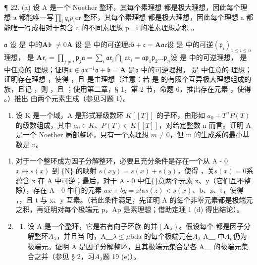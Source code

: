 ¶ 22. (a) 设 A 是一个 Noether 整环，其每个素理想  都是极大理想，因此每个理想 a  都能唯一写\(\prod_{i} q_{i}\)\(p_{i}\)er 整环，其每个素理想  都是极大理想，因此每个理想 a  都能唯一写成相对于包含 a 的不同素理想 p＿i 的准素理想之积 。

 \(\mathfrak{a}\) 设  是  中的\(\mathbf{A}\)\(\mathfrak{b}\)  \(\neq 0\)\(\mathbf{A}\) 设  是  中的可逆理\(\mathfrak{c}\)\(\mathfrak{b} + \mathfrak{c} = \mathbf{A}\)\(\mathfrak{ac}\)设  是  中的可逆\((\mathfrak{p}_i)_{1 \leqslant i \leqslant n}\)理想， 是 \(\mathbf{A}\)\(\mathfrak{r}_i = \prod_{j \neq i} \mathfrak{p}_j\)\(\mathfrak{a} = \sum_i \mathfrak{ar}_i\)\(\bigcap_i \mathfrak{ar}_i = \mathfrak{ap}_1\mathfrak{p}_2 \ldots \mathfrak{p}_n\)设  是  中的可逆理想， 是  中任意的  理想；证明\(x \in \mathfrak{a}\)\(x^{-1}\mathfrak{a} + \mathfrak{b} = \mathbf{A}\) 是\(\mathfrak{a}\)  中的可逆理想， 是  中任意的  理想；证明存在理想 ，使得 ，且  是主理想（注意：若  是  的有限个互异极大理想组成的族，且记 ，则 ，且 ；使用第二章，§ 1，第 2 节，命题 6，推出存在元素 ，使得 。）推出  由两个元素生成（参见习题 1）。

\begin{enumerate}
\def\labelenumi{(\alph{enumi})}
\setcounter{enumi}{1}
\tightlist
\item
  设 K 是一个域，A 是形式幂级数环 \(K[[T]]\) 的子环，由形如 \(a_{0} + T^{n}P(T)\) 的级数组成，其中 \(a_{0} \in K\)、\(P(T) \in K[[T]]\)，对给定整数 n 而言。证明 A 是一个 Noether 局部整环，只有一个素理想 \(m \neq 0\)，但 m 的生成系的最小基数是 n。
\end{enumerate}


\begin{enumerate}
\def\labelenumi{\arabic{enumi}.}
\item
  对于一个整环成为因子分解整环，必要且充分条件是存在一个从 A - 0\(x \mapsto s(x)\) 到 \{N\} 的映射 \(s(xy) = s(x) + s(y)\)，使得 ，关\(s(x) = 0\)系  蕴含 x 在 A 中可逆；最后，对于 A - 0 中任\{\}意两个元素 x、y（它们互不整除），存在 A - 0 中\{\}的元素 \(ax + by = zt\)a\(s(z) < s(x)\)、b、z、t，使得 ，，且 t 与 x、y 互素。（若此条件满足，先证明 A 的每个非零元素都是极端元之积，再证明对每个极端元 p，Ap 是素理想；借助定理 1 (d) 得出结论）。
\item
  \begin{enumerate}
  \def\labelenumii{(\alph{enumii})}
  \tightlist
  \item
    设 A 是一个整环，它是右有向子环族  的并\((\mathbf{A}_{\lambda})\)。假设每个  都是因子分解整环\(A_{\lambda}\)，并且当  时，A＿\(\lambda \leqslant \mu\)bda 的每个极端元在\(A_{\lambda}\) A＿ 中\(A_{\mu}\)仍为极端元。证明 A 是因子分解整环，且其极端元集合是各 A＿ 的极端元集合之并（参见 § 2，习\(A_{\lambda}\)题 19 (e)）。
  \end{enumerate}
\end{enumerate}


